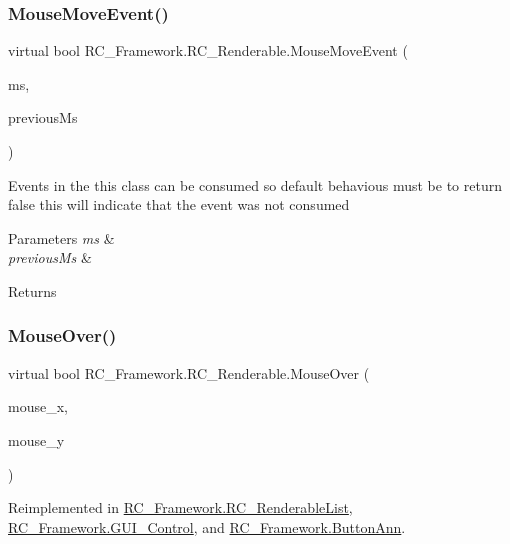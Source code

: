 \subsubsection{\texorpdfstring{Mouse\+Move\+Event()}{MouseMoveEvent()}}
{\footnotesize\ttfamily virtual bool R\+C\+\_\+\+Framework.\+R\+C\+\_\+\+Renderable.\+Mouse\+Move\+Event (\begin{DoxyParamCaption}\item[{Mouse\+State}]{ms,  }\item[{Mouse\+State}]{previous\+Ms }\end{DoxyParamCaption})\hspace{0.3cm}{\ttfamily [virtual]}}



Events in the this class can be consumed so default behavious must be to return false this will indicate that the event was not consumed 


\begin{DoxyParams}{Parameters}
{\em ms} & \\
\hline
{\em previous\+Ms} & \\
\hline
\end{DoxyParams}
\begin{DoxyReturn}{Returns}

\end{DoxyReturn}
\mbox{\label{class_r_c___framework_1_1_r_c___renderable_abd55ea96d88d7bd2207e3a4ede1f1a05}} 
\subsubsection{\texorpdfstring{Mouse\+Over()}{MouseOver()}}
{\footnotesize\ttfamily virtual bool R\+C\+\_\+\+Framework.\+R\+C\+\_\+\+Renderable.\+Mouse\+Over (\begin{DoxyParamCaption}\item[{float}]{mouse\+\_\+x,  }\item[{float}]{mouse\+\_\+y }\end{DoxyParamCaption})\hspace{0.3cm}{\ttfamily [virtual]}}



Reimplemented in \mbox{\hyperlink{class_r_c___framework_1_1_r_c___renderable_list_a5867cf3044d40adda1bb7c2be3211a99}{R\+C\+\_\+\+Framework.\+R\+C\+\_\+\+Renderable\+List}}, \mbox{\hyperlink{class_r_c___framework_1_1_g_u_i___control_ad5f72ceb3149305ce0a2891feff951a0}{R\+C\+\_\+\+Framework.\+G\+U\+I\+\_\+\+Control}}, and \mbox{\hyperlink{class_r_c___framework_1_1_button_ann_a387c65413a4dbfd360cab56476fc21a4}{R\+C\+\_\+\+Framework.\+Button\+Ann}}.

